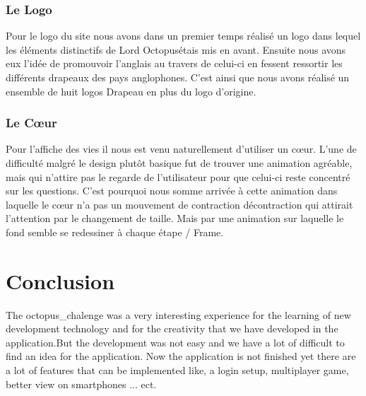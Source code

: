 \documentclass[a4paper,11pt, oneside]{book}
\def\octopusName{Lord Octopus}
\begin{document}
\subsection*{Le Logo}
Pour le logo du site nous avons dans un premier temps réalisé un logo dans lequel les éléments distinctifs de \octopusName étais mis en avant.
Ensuite nous avons eux l’idée de promouvoir l’anglais au travers de celui-ci en fessent ressortir les différents drapeaux des pays anglophones.
C’est ainsi que nous avons réalisé un ensemble de huit logos Drapeau en plus du logo d’origine.

\subsection*{Le Cœur}
Pour l’affiche des vies il nous est venu naturellement d’utiliser un cœur.
L’une de difficulté malgré le design plutôt basique fut de trouver une animation agréable, mais qui n’attire pas le regarde de l’utilisateur pour que celui-ci reste concentré sur les questions.
C’est pourquoi nous somme arrivée à cette animation dans laquelle le cœur n’a pas un mouvement de contraction décontraction qui attirait l’attention par le changement de taille. Mais par une
animation sur laquelle le fond semble se redessiner à chaque étape / Frame.


\chapter{Conclusion}
The octopus_chalenge was a very interesting experience for the learning of new development technology and for the creativity that we have developed in the application.But the development was not easy and we have a lot of difficult to find an idea for the application. 
Now the application is not finished yet there are a lot of features that can be implemented like, a login setup, multiplayer game, better view on smartphones ... ect. 
\end{document}
